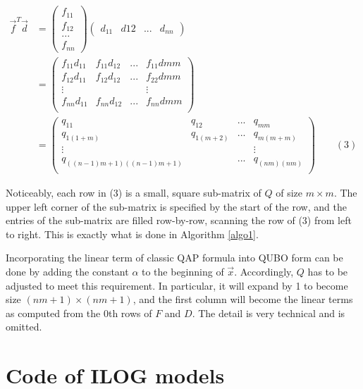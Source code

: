 \documentclass[hyp]{socreport}
\begin{document}
\begin{equation}
\begin{split}
\vec{f}^T\vec{d} & = \begin{pmatrix}f_{11}\\f_{12}\\...\\f_{nn}\end{pmatrix}
					\begin{pmatrix}d_{11} & d{12} & ... & d_{nn}\end{pmatrix} \\
				& = \begin{pmatrix}
					f_{11}d_{11} & f_{11}d_{12} & ... & f_{11}d{mm} \\
					f_{12}d_{11} & f_{12}d_{12} & ... & f_{22}d{mm} \\
					\vdots 		 & & & \vdots \\
					f_{nn}d_{11} & f_{nn}d_{12} & ... & f_{nn}d{mm} \\
					\end{pmatrix}
					\\
				& = \begin{pmatrix}
					q_{11} 	   				 & q_{12}     & ... & q_{mm} \\
					q_{1(1+m)} 				 & q_{1(m+2)} & ... & q_{m(m+m)} \\
					\vdots 	   				 &            &     & \vdots \\
					q_{((n-1)m+1)((n-1)m+1)} & 			  & ... & q_{(nm)(nm)} \\
					\end{pmatrix} \qquad (3)
\end{split}
\end{equation}
\normalspacing

Noticeably, each row in (3) is a small, square sub-matrix of $Q$ of size $m\times m$. The upper left corner of the sub-matrix is specified by the start of the row, and the entries of the sub-matrix are filled row-by-row, scanning the row of (3) from left to right. This is exactly what is done in Algorithm \ref{algo1}.

Incorporating the linear term of classic QAP formula into QUBO form can be done by adding the constant $\alpha$ to the beginning of $\vec{x}$. Accordingly, $Q$ has to be adjusted to meet this requirement. In particular, it will expand by 1 to become size $(nm+1)\times(nm+1)$, and the first column will become the linear terms as computed from the 0th rows of $F$ and $D$. The detail is very technical and is omitted.
\chapter{Code of ILOG models}
\end{document}
